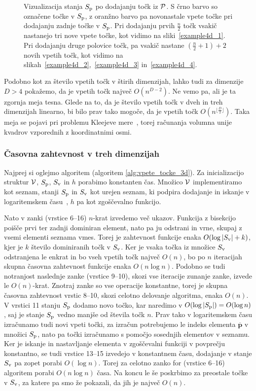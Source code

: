 \begin{dokaz}
\begin{figure}[ht]
    \caption{Vizualizacija stanja $\sp$ po dodajanju točk iz $\P$. S črno barvo so označene točke v $\sp$, z oranžno barvo pa novonastale vpete točke pri dodajanju zadnje točke v $\sp$. Pri dodajanju prvih $\frac{n}{2}$ točk vsakič nastanejo tri nove vpete točke, kot vidimo na sliki~\ref{example4d_1}. Pri dodajanju druge polovice točk, pa vsakič nastane $(\frac{n}{2} + 1) + 2$ novih vpetih točk, kot vidimo na slikah~\ref{example4d_2},~\ref{example4d_3} in~\ref{example4d_4}.}
    \label{fig:example4d}
\end{figure}

Podobno kot za število vpetih točk v štirih dimenzijah, lahko tudi za dimenzije $D > 4$ pokažemo, da je vpetih točk največ $O(n^{D-2})$. Ne vemo pa, ali je ta zgornja meja tesna. Glede na to, da je število vpetih točk v dveh in treh dimenzijah linearno, bi bilo prav tako mogoče, da je vpetih točk $O(n^{\lfloor \frac{D}{2} \rfloor})$. Taka meja se pojavi pri problemu Kleejeve mere~\cite{Bringmann}, torej računanja volumna unije kvadrov vzporednih z koordinatnimi osmi.
\end{dokaz}

\subsubsection{Časovna zahtevnost v treh dimenzijah} 
Najprej si oglejmo algoritem  (algoritem \ref{alg:vpete_tocke_3d}).
Za inicializacijo struktur $\V$, $\sp$, $\sv$ in $h$ porabimo konstanten čas. Množico $\V$ implementiramo kot seznam, stanji $\sp$ in $\sv$ kot urejen seznam, ki podpira dodajanje in iskanje v logaritemskem času~\cite{sortedcontainers}, $h$ pa kot zgoščevalno funkcijo.

Nato v zanki (vrstice 6--16) $n$-krat izvedemo več ukazov. Funkcija  z bisekcijo poišče prvi ter zadnji dominiran element, nato pa ju odstrani in vrne, skupaj z vsemi elementi seznama vmes. Torej je zahtevnost funkcije enaka $O(\log|\sv| + k)$, kjer je $k$ število dominiranih točk v $\sv$. Ker je vsaka točka iz množice $\sv$ odstranjena le enkrat in bo vseh vpetih točk največ $O(n)$, bo po $n$ iteracijah skupna časovna zahtevnost funkcije enaka $O(n \log n)$. 
Podobno se tudi notranjost naslednje zanke (vrstice 9--10), skozi vse iteracije zunanje zanke, izvede le $O(n)$-krat. Znotraj zanke so vse operacije konstantne, torej je skupna časovna zahtevnost vrstic 8--10, skozi celotno delovanje algoritma, enaka $O(n)$. 
V vrstici 11 stanju $\sp$ dodamo novo točko, kar naredimo v $O(\log|\sp|) = O(\log n)$, saj je stanje $\sp$ vedno manjše od števila točk $n$. 
Prav tako v logaritemskem času izračunamo tudi novi vpeti točki, za izračun potrebujemo le indeks elementa $\overline{\textbf{p}}$ v množici $\sp$, nato pa točki izračunamo s pomočjo sosednjih elementov v seznamu. 
Ker je iskanje in nastavljanje elementa v zgoščevalni funkciji v povprečju konstantno, se tudi vrstice 13--15 izvedejo v konstantnem času, dodajanje v stanje $\sv$ pa zopet porabi $O(\log n)$. Torej za celotno zanko for (vrstice 6--16) algoritem porabi $O(n \log n)$ časa. 
Na koncu le še poskrbimo za preostale točke v $\sv$, za katere pa smo že pokazali, da jih je največ $O(n)$. 

